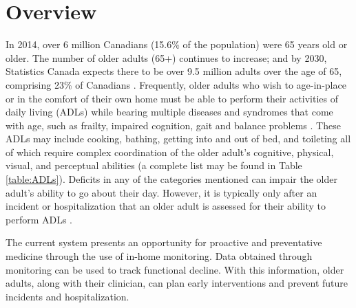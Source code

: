 \section{Overview}
In 2014, over 6 million Canadians (15.6\% of the population) were 65 years old or older. The number of older adults (65+) continues to increase; and by 2030, Statistics Canada expects there to be over 9.5 million adults over the age of 65, comprising 23\% of Canadians \cite{government_of_canada_daily_2014}. Frequently, older adults who wish to age-in-place or in the comfort of their own home must be able to perform their activities of daily living (ADLs) while bearing multiple diseases and syndromes that come with age, such as frailty, impaired cognition, gait and balance problems \cite{tijsen_challenging_2019}. These ADLs may include cooking, bathing, getting into and out of bed, and toileting all of which require complex coordination of the older adult’s cognitive, physical, visual, and perceptual abilities (a complete list may be found in Table \ref{table:ADLs}). Deficits in any of the categories mentioned can impair the older adult’s ability to go about their day. However, it is typically only after an incident or hospitalization that an older adult is assessed for their ability to perform ADLs \cite{wilkinson_comprehensive_2021}. 

The current system presents an opportunity for proactive and preventative medicine through the use of in-home monitoring. Data obtained through monitoring can be used to track functional decline. With this information, older adults, along with their clinician, can plan early interventions and prevent future incidents and hospitalization. 

